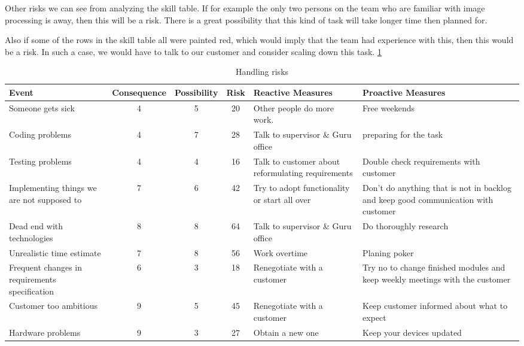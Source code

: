 Other risks we can see from analyzing the skill table. If for example the only two persons on the team who are familiar with image processing is away, then this will be a risk. There is a great possibility that this kind of task will take longer time then planned for. 

Also if some of the rows in the skill table all were painted red, which would imply that the team had experience with this, then this would be a risk. In such a case, we would have to talk to our customer and consider scaling down this task. 
\ref{tab:risks}

\begin{table}
    \caption{Handling risks}
    \label{tab:risks}
    
    \centering {}
    \vspace{2mm} %
    \begin{tabularx}{500pt}{XcccXX}
    \toprule
        Event & Consequence & Possibility & Risk  & Reactive Measures & Proactive Measures \\
    \midrule
Someone gets sick & 4     & 5     & 20    & Other people do more work.  & Free weekends \\
Coding problems & 4     & 7     & 28    & Talk to supervisor \& Guru office & preparing for the task \\
Testing problems & 4     & 4     & 16    & Talk to customer about reformulating requirements & Double check requirements with customer \\
Implementing things we are not supposed to & 7     & 6     & 42    & Try to adopt functionality or start all over & Don't do anything that is not in backlog and keep good communication with customer \\
Dead end with technologies & 8     & 8     & 64    & Talk to supervisor \& Guru office & Do thoroughly research \\
Unrealistic time estimate & 7     & 8     & 56    & Work overtime  & Planing poker \\
Frequent changes in requirements specification & 6     & 3     & 18    & Renegotiate with a customer & Try no to change finished modules and keep weekly meetings with the customer \\
Customer too ambitious & 9     & 5     & 45    & Renegotiate with a customer & Keep customer informed about what  to expect \\
Hardware problems & 9     & 3     & 27    & Obtain a new one & Keep your devices updated \\
\bottomrule
\end{tabularx}
\end{table}
